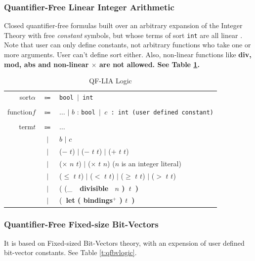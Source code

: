 \documentclass[10pt,letter]{article}
\theoremstyle{definition}
\begin{document}
\subsubsection{Quantifier-Free Linear Integer Arithmetic}
Closed quantifier-free formulas built over an arbitrary expansion of the
Integer Theory with free {\it constant} symbols, but whose terms of sort {\tt int}
are all linear \cite{bs2010}. Note that user can only define constants, not arbitrary functions who take one or more arguments. User can't define sort either. Also, non-linear functions like \bf div\rm, \bf mod\rm, \bf abs \rm and non-linear $\times$ are not allowed. See Table \ref{t:qflialogic}.

\begin{table}[!h]
\begin{mdframed}
\centering
\begin{tabular}{r c l}
sort\qquad $\alpha$ & $\Coloneqq$ & \tt bool $\mid$ int\\
\\
function\qquad $f$ & $\Coloneqq$ & $\ldots$ $\mid$ \rm $b$ : \tt bool $\mid$ \rm $c$ : \tt int \qquad(\rm user defined constant)\\
\\
term\qquad $t$ & $\Coloneqq$ & $\ldots$ \\
& $\mid$ & $b$ $\mid$ $c$\\
& $\mid$ & ($-$ $t$) $\mid$ ($-$ $t$ $t$) $\mid$ ($+$ $t$ $t$) \\
& $\mid$ & ($\times$ $n$ $t$) $\mid$ ($\times$ $t$ $n$) \qquad($n$ is an integer literal)\\
& $\mid$ & ($\leqslant$ $t$ $t$) $\mid$ ($<$ $t$ $t$) $\mid$ ($\geqslant$ $t$ $t$) $\mid$ ($>$ $t$ $t$)\\
& $\mid$ & ( (_\ \bf\ divisible \rm\ $n$ )\ $t$\ )\\
& $\mid$ & (\bf\ let \rm ( bindings$^+$ ) $t$\ )\\
\end{tabular}
\end{mdframed}
\caption{QF-LIA Logic}
\label{t:qflialogic}
\end{table}

\subsubsection{Quantifier-Free Fixed-size Bit-Vectors}
It is based on Fixed-sized Bit-Vectors theory, with an expension of user defined bit-vector constants. See Table \ref{t:qfbvlogic}.
\end{document}
